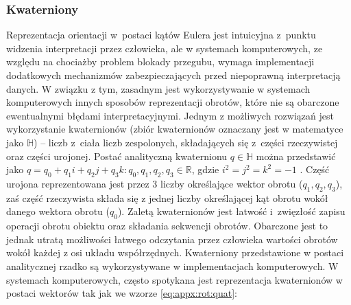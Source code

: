 %																														
%																												
%																													
%																													
\subsubsection*{Kwaterniony}
Reprezentacja orientacji w~postaci kątów Eulera jest intuicyjna z~punktu widzenia interpretacji przez człowieka, ale w systemach komputerowych, ze względu na chociażby problem blokady przegubu, wymaga implementacji dodatkowych mechanizmów zabezpieczających przed niepoprawną interpretacją danych. W związku z tym, zasadnym jest wykorzystywanie w systemach komputerowych innych sposobów reprezentacji obrotów, które nie są obarczone ewentualnymi błędami interpretacyjnymi. Jednym z możliwych rozwiązań jest wykorzystanie kwaternionów (zbiór kwaternionów oznaczany jest w matematyce jako $\mathbb{H}$) -- liczb z~ciała liczb zespolonych, składających się z~części rzeczywistej oraz części urojonej. Postać analityczną kwaternionu $q \in\mathbb{H}$ można przedstawić jako  $q = {q_0 + q_1 i + q_2 j + q_3 k : q_0, q_1, q_2, q_3 \in \mathbb{R}}$, gdzie $i^2 = j^2 = k^2 = -1$ \cite{Huerta2010}. Część urojona reprezentowana jest przez 3 liczby określające wektor obrotu ($ q_1, q_2, q_3$), zaś część rzeczywista składa się z jednej liczby określającej kąt obrotu wokół danego wektora obrotu ($q_0$). Zaletą kwaternionów jest łatwość i~zwięzłość zapisu operacji obrotu obiektu oraz składania sekwencji obrotów. Obarczone jest to jednak utratą możliwości łatwego odczytania przez człowieka wartości obrotów wokół każdej z osi układu współrzędnych. Kwaterniony przedstawione w postaci analitycznej rzadko są wykorzystywane w implementacjach komputerowych. W systemach komputerowych, często spotykana jest reprezentacja kwaternionów w postaci wektorów tak jak we wzorze \ref{eq:appx:rot:quat}:
																													
